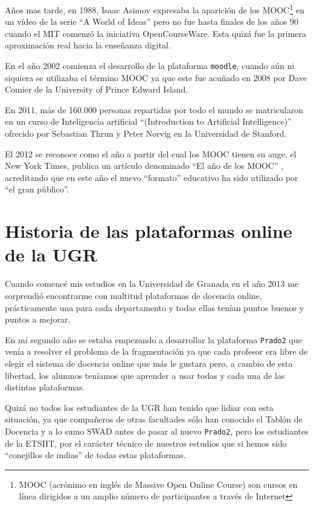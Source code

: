 \bigskip
Años mas tarde, en 1988, Isaac Asimov expresaba la aparición de los MOOC\footnote{MOOC (acrónimo en inglés de Massive Open Online Course) son cursos en línea dirigidos a un amplio número de participantes a través de Internet} en un vídeo de la serie ``A World of Ideas'' pero no fue hasta finales de los años 90 cuando el MIT comenzó la iniciativa OpenCourseWare. Esta quizá fue la primera aproximación real hacia la enseñanza digital.

\bigskip
En el año 2002 comienza el desarrollo de la plataforma \texttt{moodle}, cuando aún ni siquiera se utilizaba el término MOOC ya que este fue acuñado en 2008 por Dave Comier de la University of Prince Edward Island\cite{art_14}.

\bigskip
En 2011, más de 160.000 personas repartidas por todo el mundo se matricularon en un curso de Inteligencia artificial ``(Introduction to Artificial Intelligence)'' ofrecido por Sebastian Thrun y Peter Norvig en la Universidad de Stanford.

\bigskip
El 2012 se reconoce como el año a partir del cual los MOOC tienen su auge, el New York Times, publica un artículo denominado ``El año de los MOOC''\cite{art_13} , acreditando que en este año el nuevo ``formato'' educativo ha sido utilizado por ``el gran público''.

\section{Historia de las plataformas online de la UGR}

Cuando comencé mis estudios en la Universidad de Granada en el año 2013 me sorprendió encontrarme con multitud plataformas de docencia online, prácticamente una para cada departamento y todas ellas tenían puntos buenos y puntos a mejorar.

\bigskip
En mi segundo año se estaba empezando a desarrollar la plataforma \texttt{Prado2} que venía a resolver el problema de la fragmentación ya que cada profesor era libre de elegir el sistema de docencia online que más le gustara pero, a cambio de esta libertad, los alumnos teníamos que aprender a usar todas y cada una de las distintas plataformas.

\bigskip
Quizá no todos los estudiantes de la UGR han tenido que lidiar con esta situación, ya que compañeros de otras facultades sólo han conocido el Tablón de Docencia y a lo sumo SWAD antes de pasar al nuevo \texttt{Prado2}, pero los estudiantes de la ETSIIT, por el carácter técnico de nuestros estudios que si hemos sido ``conejillos de indias'' de todas estas plataformas.

